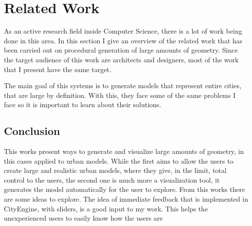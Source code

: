 
% 
% 

\section{Related Work}
\label{sec:related_work}

As an active research field inside Computer Science, there is a lot of work being done in this area. In this section I give an overview of the related work that has been carried out on procedural generation of large amounts of geometry. Since the target audience of this work are architects and designers, most of the work that I present have the same target.

The main goal of this systems is to generate models that represent entire cities, that are large by definition. With this, they face some of the same problems I face so it is important to learn about their solutions.






\subsection{Conclusion} %
\label{sub:conclusion}

This works present ways to generate and visualize large amounts of geometry, in this cases applied to urban models. While the first \cite{Parish2001} aims to allow the users to create large and realistic urban models, where they give, in the limit, total control to the users, the second one\cite{Greuter2003} is much more a visualization tool, it generates the model automatically for the user to explore.
From this works there are some ideas to explore. The idea of immediate feedback that is implemented in CityEngine, with sliders, is a good input to my work. This helps the unexperienced users to easily know how the users are 


